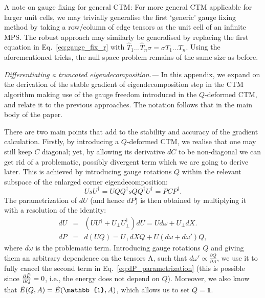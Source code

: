 \documentclass[twocolumn,floatfix,superscriptaddress,longbibliography,pra]{revtex4-2}
\renewcommand{\section}[1]{\emph{#1.---}}
\begin{document}
A note on gauge fixing for general CTM: For more general CTM applicable for larger unit cells, we may trivially generalise the first `generic' gauge fixing method by taking a row/column of edge tensors as the unit cell of an infinite MPS. The robust approach may similarly be generalised by replacing the first equation in Eq.~\eqref{eq:gauge_fix_r} with $\hat{T}_1...\hat{T}_n\sigma = \sigma T_1...T_n$. Using the aforementioned tricks, the null space problem remains of the same size as before.


\section{Differentiating a truncated eigendecomposition}
\label{appendix:differentiate-eigen}
In this appendix, we expand on the derivation of the stable gradient of eigendecomposition step in the CTM algorithm making use of the gauge freedom introduced in the $Q$-deformed CTM, and relate it to the previous approaches. The notation follows that in the main body of the paper.

There are two main points that add to the stability and accuracy of the gradient calculation. Firstly, by introducing a $Q$-deformed CTM, we realise that one may still keep $C$ diagonal; yet, by allowing its derivative $dC$ to be non-diagonal we can get rid of a problematic, possibly divergent term which we are going to derive later. This is achieved by introducing gauge rotations $Q$ within the relevant subspace of the enlarged corner eigendecomposition:
\begin{equation}
    UsU^\dagger = UQQ^\dagger s QQ^\dagger U^\dagger = PCP^\dagger.
\end{equation}
The parametrization of $dU$ (and hence $dP$) is then obtained by multiplying it with a resolution of the identity:
\begin{eqnarray}
dU &=& (UU^\dagger + U_\perp U_\perp^\dagger) dU = Ud\omega + U_\perp dX.\\
    dP &=& d(UQ) = U_\perp dX Q + U(d\omega+d\omega')Q, \label{eq:dP_parametrization}
\end{eqnarray}
where $d\omega$ is the problematic term. Introducing gauge rotations $Q$ and giving them an arbitrary dependence on the tensors A, such that $d\omega'\propto \frac{\partial Q}{\partial A}$, we use it to fully cancel the second term in Eq.~\eqref{eq:dP_parametrization} (this is possible since $\frac{\partial \Tilde{E}}{\partial Q} = 0$, i.e., the energy does not depend on $Q$). Moreover, we also know that $\Tilde{E}(Q,A) = \Tilde{E}(\mathbb{1},A)$, which allows us to set $Q=\mathbb{1}$.
\end{document}
